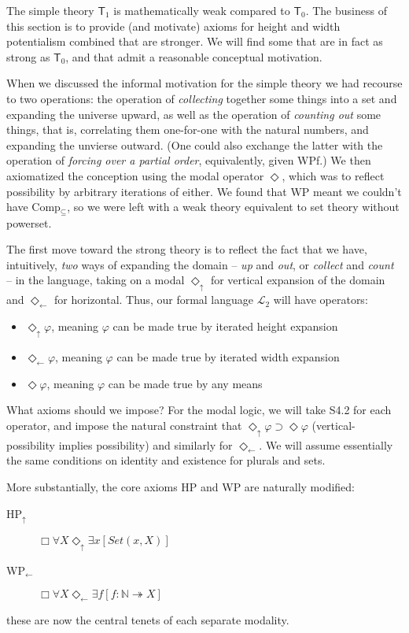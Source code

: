 \documentclass{article}
\newcommand{\du}{\Diamond_\uparrow}
\newcommand{\dl}{\Diamond_\leftarrow}
\begin{document}
The simple theory $\mathsf{T}_1$ is mathematically weak compared to $\mathsf{T}_0$.
The business of this section is to provide (and motivate) axioms for height and width 
potentialism combined that are stronger. We will find some that are in fact 
as strong as $\mathsf{T}_0$, and that admit a reasonable conceptual motivation.

When we discussed the informal motivation for the simple theory we had recourse to 
two operations: the operation of \emph{collecting} together some things into a set and expanding 
the universe upward,
as well as the operation of \emph{counting out} some things, that is, correlating them 
one-for-one with the natural numbers, and expanding the unvierse outward.
(One could also exchange the latter with the operation of \emph{forcing over a partial order}, 
equivalently, given WPf.)
We then axiomatized the conception using 
the modal operator $\Diamond$, which was to reflect possibility by arbitrary 
iterations of either. We found that WP meant we couldn't have Comp$_\subseteq$, 
so we were left with a weak theory equivalent to set theory without powerset.

The first move toward the strong theory is to reflect the fact that we have, 
intuitively, \emph{two} ways of expanding the domain -- \emph{up} and \emph{out}, 
or \emph{collect} and \emph{count} -- in the language, taking on a modal $\du$ for vertical 
expansion of the domain and $\dl$ for horizontal. Thus, our formal language $\mathcal{L_2}$
will have operators:
\begin{itemize}
    \item $\du \varphi$, meaning $\varphi$ can be made true by iterated height expansion
    \item $\dl \varphi$, meaning $\varphi$ can be made true by iterated width expansion
    \item $\Diamond \varphi$, meaning $\varphi$ can be made true by any means
\end{itemize}
What axioms should we impose? For the modal logic, we will 
take S4.2 for each operator, and impose the natural constraint that $\du \varphi \supset \Diamond \varphi$ 
(vertical-possibility implies possibility) and similarly for $\dl$. 
We will assume essentially the same conditions on identity and existence for plurals and sets.

More substantially, the core axioms HP and WP are naturally modified:
\begin{description} 
    \item[HP$_\uparrow$] $\Box \forall X \du \exists x [Set(x, X)]$
    \item[WP$_\leftarrow$] $\Box \forall X \dl \exists f[f : \mathbb{N} \twoheadrightarrow X]$
\end{description}
these are now the central tenets of each separate modality. 
\end{document}
